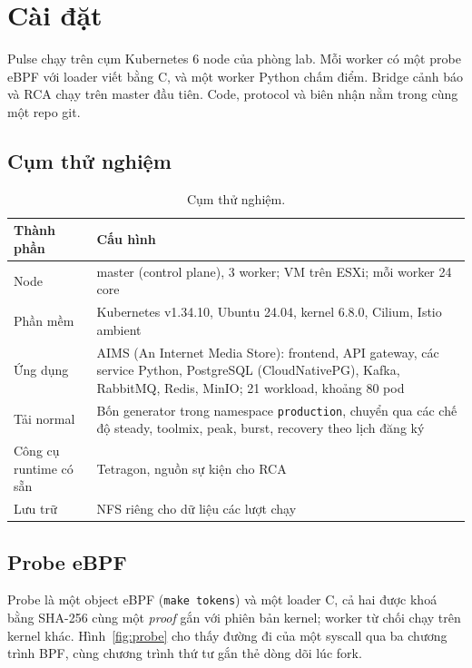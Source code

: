 \chapter{Cài đặt}

Pulse chạy trên cụm Kubernetes 6 node của phòng lab. Mỗi worker có một probe eBPF với loader viết bằng C, và một worker Python chấm điểm. Bridge cảnh báo và RCA chạy trên master đầu tiên. Code, protocol và biên nhận nằm trong cùng một repo git.

\section{Cụm thử nghiệm}

\begin{longtable}[]{@{}>{\raggedright\arraybackslash}p{}>{\raggedright\arraybackslash}p{}@{}}
\caption{Cụm thử nghiệm.}\label{tab:cluster}\\
\toprule\noalign{}
Thành phần & Cấu hình \\
\midrule\noalign{}
\endhead
\bottomrule\noalign{}
\endlastfoot
Node & 3 master (control plane), 3 worker; VM trên ESXi; mỗi worker 24 core \\
Phần mềm & Kubernetes v1.34.10, Ubuntu 24.04, kernel 6.8.0, Cilium, Istio ambient \\
Ứng dụng & AIMS (An Internet Media Store): frontend, API gateway, các service Python, PostgreSQL (CloudNativePG), Kafka, RabbitMQ, Redis, MinIO; 21 workload, khoảng 80 pod \\
Tải normal & Bốn generator trong namespace \texttt{production}, chuyển qua các chế độ steady, toolmix, peak, burst, recovery theo lịch đăng ký \\
Công cụ runtime có sẵn & Tetragon, nguồn sự kiện cho RCA \\
Lưu trữ & NFS riêng cho dữ liệu các lượt chạy \\
\end{longtable}

\section{Probe eBPF}\label{sec:token-impl}

Probe là một object eBPF (\texttt{make tokens}) và một loader C, cả hai được khoá bằng SHA-256 cùng một \emph{proof} gắn với phiên bản kernel; worker từ chối chạy trên kernel khác. Hình~\ref{fig:probe} cho thấy đường đi của một syscall qua ba chương trình BPF, cùng chương trình thứ tư gắn thẻ dòng dõi lúc fork.

